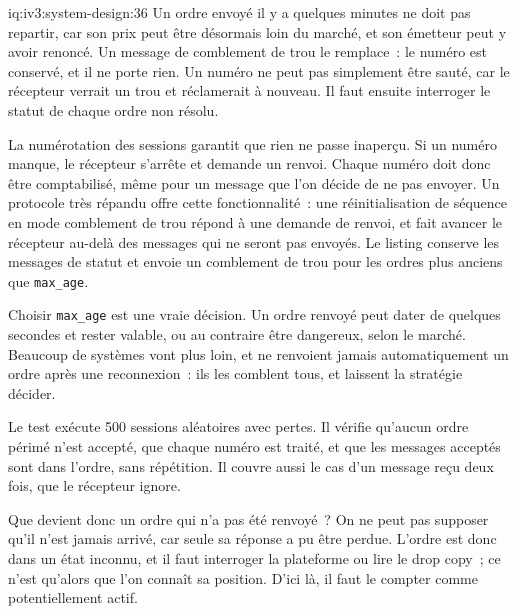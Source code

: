 \begin{solution}{iq:iv3:system-design:36}
Un ordre envoyé il y a quelques minutes ne doit pas repartir, car son prix peut être désormais loin du marché, et son émetteur peut y avoir renoncé. Un message de comblement de trou le remplace~: le numéro est conservé, et il ne porte rien. Un numéro ne peut pas simplement être sauté, car le récepteur verrait un trou et réclamerait à nouveau. Il faut ensuite interroger le statut de chaque ordre non résolu.
\label{lst:iv3:sd:session}

La numérotation des sessions garantit que rien ne passe inaperçu. Si un numéro manque, le récepteur s'arrête et demande un renvoi. Chaque numéro doit donc être comptabilisé, même pour un message que l'on décide de ne pas envoyer. Un protocole très répandu offre cette fonctionnalité~: une réinitialisation de séquence en mode comblement de trou répond à une demande de renvoi, et fait avancer le récepteur au-delà des messages qui ne seront pas envoyés. Le listing conserve les messages de statut et envoie un comblement de trou pour les ordres plus anciens que \texttt{max\_age}.

Choisir \texttt{max\_age} est une vraie décision. Un ordre renvoyé peut dater de quelques secondes et rester valable, ou au contraire être dangereux, selon le marché. Beaucoup de systèmes vont plus loin, et ne renvoient jamais automatiquement un ordre après une reconnexion~: ils les comblent tous, et laissent la stratégie décider.

Le test exécute 500 sessions aléatoires avec pertes. Il vérifie qu'aucun ordre périmé n'est accepté, que chaque numéro est traité, et que les messages acceptés sont dans l'ordre, sans répétition. Il couvre aussi le cas d'un message reçu deux fois, que le récepteur ignore.

Que devient donc un ordre qui n'a pas été renvoyé~? On ne peut pas supposer qu'il n'est jamais arrivé, car seule sa réponse a pu être perdue. L'ordre est donc dans un état inconnu, et il faut interroger la plateforme ou lire le drop copy~; ce n'est qu'alors que l'on connaît sa position. D'ici là, il faut le compter comme potentiellement actif.

\end{solution}

